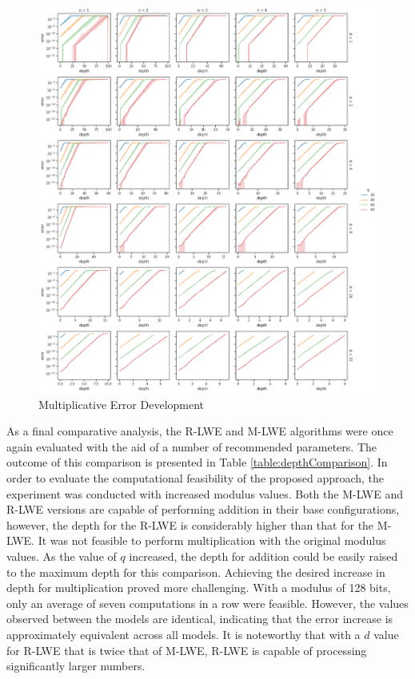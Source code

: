 \begin{figure}[ht!]
  \centering
  \includegraphics[scale=0.38]{images/MulErrorDevelopment.png}
  \caption[Multiplicative Error Development]{Multiplicative Error Development}
  \label{fig:MulErrorDev}
\end{figure}

As a final comparative analysis, the R-LWE and M-LWE algorithms were once again evaluated with the aid of a number of recommended parameters. The outcome of this comparison is presented in Table \ref{table:depthComparison}. In order to evaluate the computational feasibility of the proposed approach, the experiment was conducted with increased modulus values. Both the M-LWE and R-LWE versions are capable of performing addition in their base configurations, however, the depth for the R-LWE is considerably higher than that for the M-LWE. It was not feasible to perform multiplication with the original modulus values. As the value of $q$ increased, the depth for addition could be easily raised to the maximum depth for this comparison. Achieving the desired increase in depth for multiplication proved more challenging. With a modulus of 128 bits, only an average of seven computations in a row were feasible. However, the values observed between the models are identical, indicating that the error increase is approximately equivalent across all models. It is noteworthy that with a $d$ value for R-LWE that is twice that of M-LWE, R-LWE is capable of processing significantly larger numbers.

